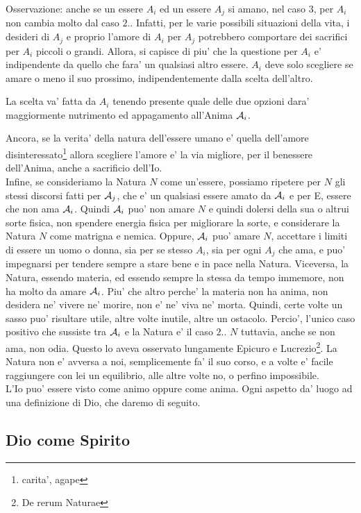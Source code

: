 Osservazione: anche se un essere $A_i$ ed un essere $A_j$ si amano, nel caso $3$, per $A_i$ non cambia molto dal caso $2.$. Infatti, per le varie possibili situazioni della vita, i desideri di $A_j$ e proprio l'amore di $A_i$ per $A_j$ potrebbero comportare dei sacrifici per $A_i$ piccoli o grandi. Allora, si capisce di piu' che la questione per $A_i$ e' indipendente da quello che fara' un qualsiasi altro essere. $A_i$ deve solo scegliere se amare o meno il suo prossimo, indipendentemente dalla scelta dell'altro.

La scelta va' fatta da $A_i$ tenendo presente quale delle due opzioni dara' maggiormente nutrimento ed appagamento all'Anima $\mathcal{A}_i$. 

Ancora, se la verita' della natura dell'essere umano e' quella dell'amore disinteressato\footnote{carita', agape} allora scegliere l'amore e' la via migliore, per il benessere dell'Anima, anche a sacrificio dell'Io. \\

Infine, se consideriamo la Natura $N$ come un'essere, possiamo ripetere per $N$ gli stessi discorsi fatti per $\mathcal{A}_j$, che e' un qualsiasi essere amato da $\mathcal{A}_i$ e per E, essere che non ama $\mathcal{A}_i$. Quindi $\mathcal{A}_i$ puo' non amare $N$ e quindi dolersi della sua o altrui sorte fisica, non spendere energia fisica per migliorare la sorte, e considerare la Natura $N$ come matrigna e nemica. Oppure, $\mathcal{A}_i$ puo' amare $N$, accettare i limiti di essere un uomo o donna, sia per se stesso $A_i$, sia per ogni $A_j$ che ama, e puo' impegnarsi per tendere sempre a stare bene e in pace nella Natura. Viceversa, la Natura, essendo materia, ed essendo sempre la stessa da tempo immemore, non ha molto da amare $\mathcal{A}_i$. Piu' che altro perche' la materia non ha anima, non desidera ne' vivere ne' morire, non e' ne' viva ne' morta. Quindi, certe volte un sasso puo' risultare utile, altre volte inutile, altre un ostacolo. Percio', l'unico caso positivo che sussiste tra $\mathcal{A}_i$ e la Natura e' il caso $2.$. $N$ tuttavia, anche se non ama, non odia. Questo lo aveva osservato lungamente Epicuro e Lucrezio\footnote{De rerum Naturae}. La Natura non e' avversa a noi, semplicemente fa' il suo corso, e a volte e' facile raggiungere con lei un equilibrio, alle altre volte no, o perfino impossibile. \\

L'Io puo' essere visto come animo oppure come anima. Ogni aspetto da' luogo ad una definizione di Dio, che daremo di seguito.

\subsection{Dio come Spirito}
\label{DioComeSpirito}

